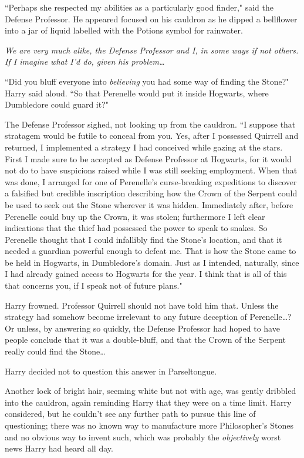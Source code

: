 ``Perhaps she respected my abilities as a particularly good finder," said the Defense Professor. He appeared focused on his cauldron as he dipped a bellflower into a jar of liquid labelled with the Potions symbol for rainwater.

\emph{We are very much alike, the Defense Professor and I, in some ways if not others. If I imagine what I'd do, given his problem{\ldots}}

``Did you bluff everyone into \emph{believing} you had some way of finding the Stone?" Harry said aloud. ``So that Perenelle would put it inside Hogwarts, where Dumbledore could guard it?"

The Defense Professor sighed, not looking up from the cauldron. ``I suppose that stratagem would be futile to conceal from you. Yes, after I possessed Quirrell and returned, I implemented a strategy I had conceived while gazing at the stars. First I made sure to be accepted as Defense Professor at Hogwarts, for it would not do to have suspicions raised while I was still seeking employment. When that was done, I arranged for one of Perenelle's curse-breaking expeditions to discover a falsified but credible inscription describing how the Crown of the Serpent could be used to seek out the Stone wherever it was hidden. Immediately after, before Perenelle could buy up the Crown, it was stolen; furthermore I left clear indications that the thief had possessed the power to speak to snakes. So Perenelle thought that I could infallibly find the Stone's location, and that it needed a guardian powerful enough to defeat me. That is how the Stone came to be held in Hogwarts, in Dumbledore's domain. Just as I intended, naturally, since I had already gained access to Hogwarts for the year. I think that is all of this that concerns you, if I speak not of future plans."

Harry frowned. Professor Quirrell should not have told him that. Unless the strategy had somehow become irrelevant to any future deception of Perenelle{\ldots}? Or unless, by answering so quickly, the Defense Professor had hoped to have people conclude that it was a double-bluff, and that the Crown of the Serpent really could find the Stone{\ldots}

Harry decided not to question this answer in Parseltongue.

Another lock of bright hair, seeming white but not with age, was gently dribbled into the cauldron, again reminding Harry that they were on a time limit. Harry considered, but he couldn't see any further path to pursue this line of questioning; there was no known way to manufacture more Philosopher's Stones and no obvious way to invent such, which was probably the \emph{objectively} worst news Harry had heard all day.

